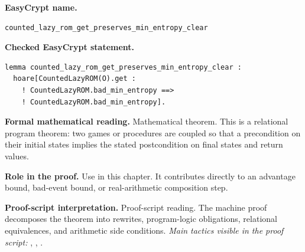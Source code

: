 \begin{formaltheorem}
\noindent\textbf{EasyCrypt name.}
\begin{lstlisting}[language=EasyCrypt,basicstyle=\ttfamily\scriptsize]
counted_lazy_rom_get_preserves_min_entropy_clear
\end{lstlisting}
\noindent\textbf{Checked EasyCrypt statement.}
\begin{lstlisting}[language=EasyCrypt,basicstyle=\ttfamily\scriptsize]
lemma counted_lazy_rom_get_preserves_min_entropy_clear :
  hoare[CountedLazyROM(O).get :
    ! CountedLazyROM.bad_min_entropy ==>
    ! CountedLazyROM.bad_min_entropy].
\end{lstlisting}
\noindent\textbf{Formal mathematical reading.}
Mathematical theorem. This is a relational program theorem: two games or procedures are coupled so that a precondition on their initial states implies the stated postcondition on final states and return values.

\noindent\textbf{Role in the proof.}
Use in this chapter. It contributes directly to an advantage bound, bad-event bound, or real-arithmetic composition step.

\noindent\textbf{Proof-script interpretation.}
Proof-script reading. The machine proof decomposes the theorem into rewrites, program-logic obligations, relational equivalences, and arithmetic side conditions.
\emph{Main tactics visible in the proof script:} , , .

\end{formaltheorem}

